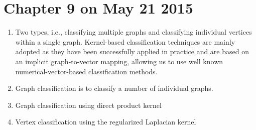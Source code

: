 \documentclass[14pt]{article}
\begin{document}
\section{Chapter 9 on May 21 2015}
\begin{enumerate}
 \item Two types, i.e., classifying multiple graphs and classifying individual vertices within a single graph. Kernel-based classification techniques are mainly adopted as they have been successfully applied in practice and are based on an implicit graph-to-vector mapping, allowing us to use well known numerical-vector-based classification methods.
 \item Graph classification is to classify a number of individual graphs.
 \item Graph classification using direct product kernel
 \item Vertex classification using the regularized Laplacian kernel
\end{enumerate}
\end{document}
